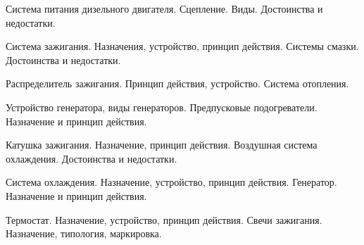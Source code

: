 \documentclass[
	14pt,
	a4paper,
	]
	{scrartcl}
\begin{document}
\vfill

\newpage


\shapk
{}
\setcounter{zad}{0}

\vfill
\z Система питания дизельного двигателя.
 \vfill
\z Сцепление. Виды. Достоинства и недостатки.
 \vfill

\vfill

\newpage


\shapk
{}
\setcounter{zad}{0}

\vfill
\z Система зажигания. Назначения, устройство, принцип действия.
 \vfill
\z Системы смазки. Достоинства и недостатки.
 \vfill

\vfill

\newpage


\shapk
{}
\setcounter{zad}{0}

\vfill
\z Распределитель зажигания. Принцип действия, устройство.
 \vfill
\z Система отопления.
 \vfill

\vfill

\newpage


\shapk
{}
\setcounter{zad}{0}

\vfill
\z Устройство генератора, виды генераторов.
 \vfill
\z Предпусковые подогреватели. Назначение и принцип действия.
 \vfill

\vfill

\newpage


\shapk
{}
\setcounter{zad}{0}

\vfill
\z Катушка зажигания. Назначение, принцип действия.
 \vfill
\z Воздушная система охлаждения. Достоинства и недостатки.
 \vfill

\vfill

\newpage


\shapk
{}
\setcounter{zad}{0}

\vfill
\z Система охлаждения. Назначение, устройство, принцип действия.
 \vfill
\z Генератор. Назначение и принцип действия.
 \vfill

\vfill

\newpage


\shapk
{}
\setcounter{zad}{0}

\vfill
\z Термостат. Назначение, устройство, принцип действия.
 \vfill
\z Свечи зажигания. Назначение, типология, маркировка.
 \vfill

\vfill

\newpage
\end{document}
